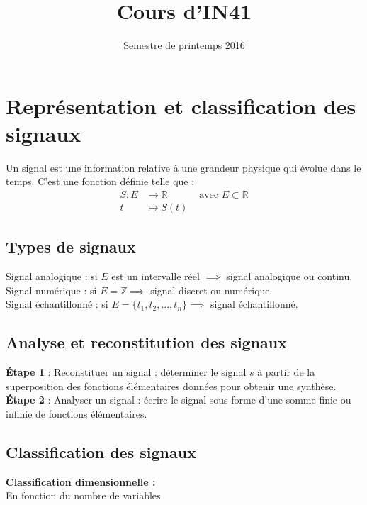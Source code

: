 \documentclass[a4paper,12pt]{report}
\title{Cours d'IN41}{Analyse et traitement du signal}
\author{}
\date{Semestre de printemps 2016}
\begin{document}
\maketitlepage

\tableofcontents
\pagebreak

\chapter{Représentation et classification des signaux}

\begin{defi}[Signal]
    Un signal est une information relative à une grandeur physique qui évolue dans le temps. C'est une fonction définie telle que :
    \begin{align*}
        S : E & \to \mathbb{R} & \text{ avec } E \subset \mathbb{R} \\
        t & \longmapsto S(t) &
    \end{align*}
\end{defi}

\neverindent

\section{Types de signaux}

Signal analogique : si $E$ est un intervalle réel $\implies$ signal analogique ou continu. \\
Signal numérique : si $E = \mathbb{Z} \implies$ signal discret ou numérique. \\
Signal échantillonné : si $E = \{t_{1}, t_{2}, ..., t_{n}\} \implies$ signal échantillonné.

\section{Analyse et reconstitution des signaux}

\textbf{\'Etape 1} : Reconstituer un signal : déterminer le signal $s$ à partir de la superposition des fonctions élémentaires données pour obtenir une synthèse. \\
\textbf{\'Etape 2} : Analyser un signal : écrire le signal sous forme d'une somme finie ou infinie de fonctions élémentaires.

\section{Classification des signaux}

\textbf{Classification dimensionnelle :} \\
En fonction du nombre de variables
\end{document}
